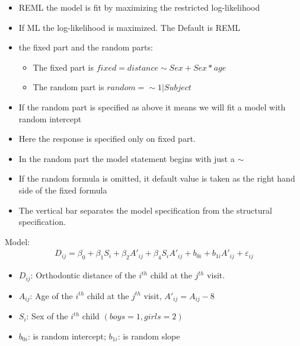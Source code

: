 \documentclass{beamer}
\begin{document}
\begin{frame}
\begin{itemize}
	\item REML the model is fit by maximizing the restricted log-likelihood
	\item If ML the log-likelihood is maximized. The Default is REML
	\item the fixed part and the random parts:
	\begin{itemize}
		\item The fixed part is $fixed = distance \sim Sex+Sex*age$
		\item The random part is $random =\sim1 |Subject$
	\end{itemize}
\item If the random part is specified as above it means we will fit a model with random intercept
\item Here the response is specified only on fixed part.
\item In the random part the model statement begins with just a $\sim$
\item If the random formula is omitted, it default value is taken as the right hand side of the fixed formula
\item The vertical bar separates the model specification from the structural specification.
\end{itemize}
\end{frame}

\begin{frame}{Model:}
\begin{eqnarray*}
	D_{ij}=\beta_0 +  \beta_1S_i + \beta_2A'_{ij} + \beta_4S_iA'_{ij}  + b_{0i}+ b_{1i}A'_{ij} + \varepsilon_{ij}
\end{eqnarray*}
\begin{itemize}
	\item $D_{ij}$: Orthodontic distance of the $i^{th}$ child at the $j^{th}$ visit.
	\item $A_{ij}$: Age of the $i^{th}$ child at the $j^{th}$ visit, $A'_{ij}=A_{ij}-8$
	\item $S_i$: Sex of the $i^{th}$ child $(boys=1, girls=2)$
	\item $b_{0i}$: is random intercept; $b_{1i}$: is random slope
\end{itemize}
\end{frame}
\end{document}
